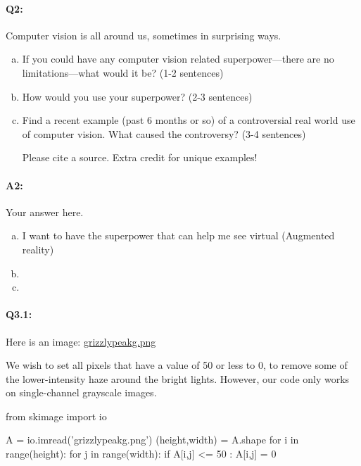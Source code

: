 \documentclass[11pt]{article}
\begin{document}
\paragraph{Q2:}
Computer vision is all around us, sometimes in surprising ways.
\begin{enumerate}[(a)]

\item
If you could have any computer vision related superpower---there are no limitations---what would it be? (1-2 sentences)

\item
How would you use your superpower? (2-3 sentences)

\item Find a recent example (past 6 months or so) of a controversial real world use of computer vision. What caused the controversy? (3-4 sentences)

Please cite a source. Extra credit for unique examples!
\end{enumerate}

\paragraph{A2:} Your answer here.

\begin{enumerate}[(a)]

\item I want to have the superpower that can help me see virtual (Augmented reality)

\item

\item

\end{enumerate}



\pagebreak
\paragraph{Q3.1:} Here is an image: \href{grizzlypeakg.png}{grizzlypeakg.png}

We wish to set all pixels that have a value of 50 or less to 0, to remove some of the lower-intensity haze around the bright lights. However, our code only works on single-channel grayscale images.

\begin{python}
from skimage import io

A = io.imread('grizzlypeakg.png')
(height,width) = A.shape
for i in range(height):
    for j in range(width):
        if A[i,j] <= 50 :
            A[i,j] = 0
\end{python}
\end{document}
